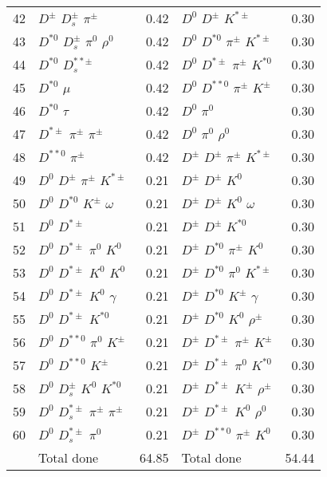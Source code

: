 \documentclass[6pt]{article}
\begin{document}
\begin{tabular}{rlr|lr}
42 & $D^{\pm}$ $D_s^{\pm}$ $\pi^{\pm}$ & 0.42 & $D^0$ $D^{\pm}$ $K^{*\pm}$ & 0.30 \\
43 & $D^{*0}$ $D_s^{\pm}$ $\pi^0$ $\rho^0$ & 0.42 & $D^0$ $D^{*0}$ $\pi^{\pm}$ $K^{*\pm}$ & 0.30 \\
44 & $D^{*0}$ $D_s^{**\pm}$ & 0.42 & $D^0$ $D^{*\pm}$ $\pi^{\pm}$ $K^{*0}$ & 0.30 \\
45 & $D^{*0}$ $\mu$ & 0.42 & $D^0$ $D^{**0}$ $\pi^{\pm}$ $K^{\pm}$ & 0.30 \\
46 & $D^{*0}$ $\tau$ & 0.42 & $D^0$ $\pi^0$ & 0.30 \\
47 & $D^{*\pm}$ $\pi^{\pm}$ $\pi^{\pm}$ & 0.42 & $D^0$ $\pi^0$ $\rho^0$ & 0.30 \\
48 & $D^{**0}$ $\pi^{\pm}$ & 0.42 & $D^{\pm}$ $D^{\pm}$ $\pi^{\pm}$ $K^{*\pm}$ & 0.30 \\
49 & $D^0$ $D^{\pm}$ $\pi^{\pm}$ $K^{*\pm}$ & 0.21 & $D^{\pm}$ $D^{\pm}$ $K^0$ & 0.30 \\
50 & $D^0$ $D^{*0}$ $K^{\pm}$ $\omega$ & 0.21 & $D^{\pm}$ $D^{\pm}$ $K^0$ $\omega$ & 0.30 \\
51 & $D^0$ $D^{*\pm}$ & 0.21 & $D^{\pm}$ $D^{\pm}$ $K^{*0}$ & 0.30 \\
52 & $D^0$ $D^{*\pm}$ $\pi^0$ $K^0$ & 0.21 & $D^{\pm}$ $D^{*0}$ $\pi^{\pm}$ $K^0$ & 0.30 \\
53 & $D^0$ $D^{*\pm}$ $K^0$ $K^0$ & 0.21 & $D^{\pm}$ $D^{*0}$ $\pi^0$ $K^{*\pm}$ & 0.30 \\
54 & $D^0$ $D^{*\pm}$ $K^0$ $\gamma$ & 0.21 & $D^{\pm}$ $D^{*0}$ $K^{\pm}$ $\gamma$ & 0.30 \\
55 & $D^0$ $D^{*\pm}$ $K^{*0}$ & 0.21 & $D^{\pm}$ $D^{*0}$ $K^0$ $\rho^{\pm}$ & 0.30 \\
56 & $D^0$ $D^{**0}$ $\pi^0$ $K^{\pm}$ & 0.21 & $D^{\pm}$ $D^{*\pm}$ $\pi^{\pm}$ $K^{\pm}$ & 0.30 \\
57 & $D^0$ $D^{**0}$ $K^{\pm}$ & 0.21 & $D^{\pm}$ $D^{*\pm}$ $\pi^0$ $K^{*0}$ & 0.30 \\
58 & $D^0$ $D_s^{\pm}$ $K^0$ $K^{*0}$ & 0.21 & $D^{\pm}$ $D^{*\pm}$ $K^{\pm}$ $\rho^{\pm}$ & 0.30 \\
59 & $D^0$ $D_s^{*\pm}$ $\pi^{\pm}$ $\pi^{\pm}$ & 0.21 & $D^{\pm}$ $D^{*\pm}$ $K^0$ $\rho^0$ & 0.30 \\
60 & $D^0$ $D_s^{*\pm}$ $\pi^0$ & 0.21 & $D^{\pm}$ $D^{**0}$ $\pi^{\pm}$ $K^0$ & 0.30 \\
\hline & Total done & 64.85 & Total done & 54.44\\
\end{tabular}
\end{document}

